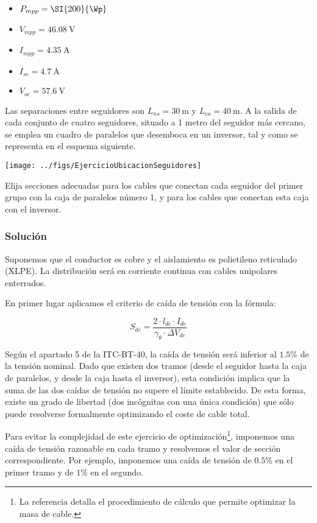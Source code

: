 \begin{itemize}
\item $P_{mpp}=\SI{200}{\Wp}$
\item $V_{mpp}=\SI{46.08}{\volt}$
\item $I_{mpp}=\SI{4.35}{\ampere}$
\item $I_{sc}=\SI{4.7}{\ampere}$
\item $V_{oc}=\SI{57.6}{\volt}$
\end{itemize}


Las separaciones entre seguidores son $L_{ns}=\SI{30}{\metre}$ y
$L_{eo}=\SI{40}{\metre}$. A la salida de cada conjunto de cuatro
seguidores, situado a 1 metro del seguidor más cercano, 
se emplea un cuadro de paralelos que desemboca en un
inversor, tal y como se representa en el esquema siguiente.

\begin{center}
\texttt{[image: ../figs/EjercicioUbicacionSeguidores]}  
\end{center}


Elija secciones adecuadas para los cables que conectan cada seguidor del
primer grupo con la caja de paralelos número 1, y para los cables que
conectan esta caja con el inversor.

\subsubsection{Solución}

Suponemos que el conductor es cobre y el aislamiento es polietileno
reticulado (XLPE). La distribución será en corriente continua con
cables unipolares enterrados.

En primer lugar aplicamos el criterio de caída de tensión con la fórmula:

\[S_{dc} =  \frac{2\cdot l_{dc}\cdot I_{dc}}{\gamma_\theta\cdot\Delta V_{dc}}\]

Según el apartado 5 de la ITC-BT-40, la caída de tensión será inferior
al $1.5\%$ de la tensión nominal. Dado que existen dos tramos (desde el
seguidor hasta la caja de paralelos, y desde la caja hasta el
inversor), esta condición implica que la suma de las dos caídas de
tensión no supere el límite establecido. De esta forma, existe un
grado de libertad (dos incógnitas con una única condición) que sólo
puede resolverse formalmente optimizando el coste de cable total. 

Para evitar la complejidad de este ejercicio de
optimización\footnote{La referencia \cite{Perpinan2012b} detalla el
  procedimiento de cálculo que permite optimizar la masa de cable.}, imponemos una
caída de tensión razonable en cada tramo y resolvemos el valor de
sección correspondiente. Por ejemplo, imponemos una caída de tensión
de $0.5\%$ en el primer tramo y de $1\%$  en el segundo.

